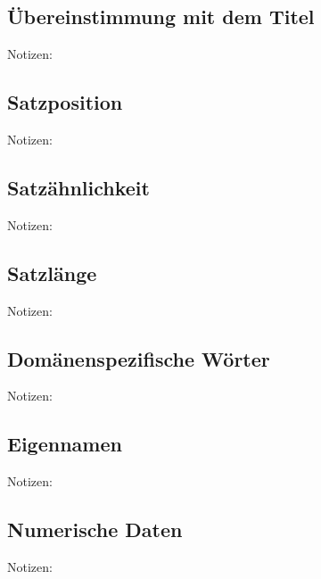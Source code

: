 \subsection{Übereinstimmung mit dem Titel}
Notizen:


\subsection{Satzposition}
Notizen:


\subsection{Satzähnlichkeit}
Notizen:


\subsection{Satzlänge}
Notizen:


\subsection{Domänenspezifische Wörter}
Notizen:


\subsection{Eigennamen}
Notizen:


\subsection{Numerische Daten}
Notizen:
